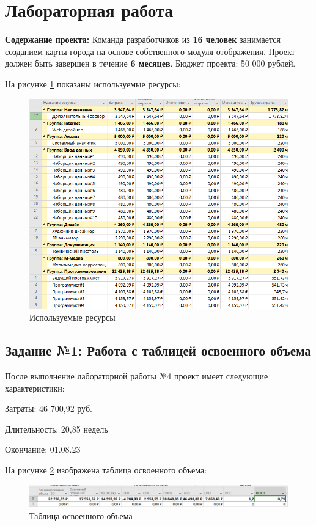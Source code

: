 \section*{Лабораторная работа}
\textbf{Содержание проекта:} Команда разработчиков из \textbf{16 человек} занимается созданием карты города на основе собственного модуля отображения. Проект должен быть завершен в течение \textbf{6 месяцев}. Бюджет проекта: 50 000 рублей.

На рисунке \ref{p0} показаны используемые ресурсы:
\begin{figure}[!h]
	\centering
	\includegraphics[width=1\linewidth]{inc/img/0.png}
	\caption{Используемые ресурсы}
	\label{p0}
\end{figure}

\newpage
\subsection*{Задание №1: Работа с таблицей освоенного объема}
После выполнение лабораторной работы №4 проект имеет следующие характеристики:

\noindent Затраты: 46 700,92 руб.

\noindent Длительность: 20,85 недель

\noindent Окончание: 01.08.23

На рисунке \ref{p1} изображена таблица освоенного объема:
\begin{figure}[!h]
	\centering
	\includegraphics[width=1\linewidth]{inc/img/1.png}
	\caption{Таблица освоенного объема}
	\label{p1}
\end{figure}

